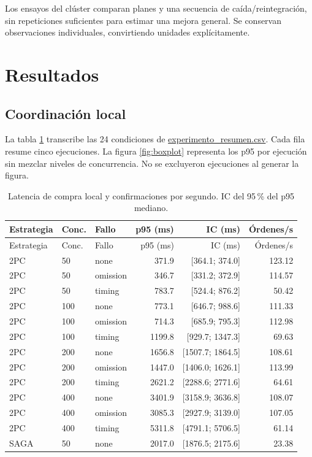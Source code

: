 \documentclass[12pt,a4paper]{article}
\newcommand{\evidencia}[2]{\href{https://github.com/JoseLozanoMorales/TiendaTech/blob/e6680b0290d2c6921ea47116c2df60bd7b055de0/#1}{#2}}
\newcommand{\seccion}[1]{\section{#1}}
\begin{document}
Los ensayos del clúster comparan planes y una secuencia de caída/reintegración, sin repeticiones suficientes para estimar una mejora general. Se conservan observaciones individuales, convirtiendo unidades explícitamente.

\seccion{Resultados}
\subsection{Coordinación local}
La tabla \ref{tab:coordinacion} transcribe las 24 condiciones de \evidencia{experiments/paso8/resultados/experimento_resumen.csv}{experimento\_resumen.csv}. Cada fila resume cinco ejecuciones. La figura \ref{fig:boxplot} representa los p95 por ejecución sin mezclar niveles de concurrencia. No se excluyeron ejecuciones al generar la figura.

{\small
\begin{longtable}{lllrrr}
\caption{Latencia de compra local y confirmaciones por segundo. IC del 95\,\% del p95 mediano.}\label{tab:coordinacion}\\
\toprule Estrategia & Conc. & Fallo & p95 (ms) & IC (ms) & Órdenes/s\\\midrule\endfirsthead
\toprule Estrategia & Conc. & Fallo & p95 (ms) & IC (ms) & Órdenes/s\\\midrule\endhead
2PC & 50 & none & 371.9 & [364.1; 374.0] & 123.12 \\
2PC & 50 & omission & 346.7 & [331.2; 372.9] & 114.57 \\
2PC & 50 & timing & 783.7 & [524.4; 876.2] & 50.42 \\
2PC & 100 & none & 773.1 & [646.7; 988.6] & 111.33 \\
2PC & 100 & omission & 714.3 & [685.9; 795.3] & 112.98 \\
2PC & 100 & timing & 1199.8 & [929.7; 1347.3] & 69.63 \\
2PC & 200 & none & 1656.8 & [1507.7; 1864.5] & 108.61 \\
2PC & 200 & omission & 1447.0 & [1406.0; 1626.1] & 113.99 \\
2PC & 200 & timing & 2621.2 & [2288.6; 2771.6] & 64.61 \\
2PC & 400 & none & 3401.9 & [3158.9; 3636.8] & 108.07 \\
2PC & 400 & omission & 3085.3 & [2927.9; 3139.0] & 107.05 \\
2PC & 400 & timing & 5311.8 & [4791.1; 5706.5] & 61.14 \\
SAGA & 50 & none & 2017.0 & [1876.5; 2175.6] & 23.38 \\

\end{longtable}}
\end{document}
